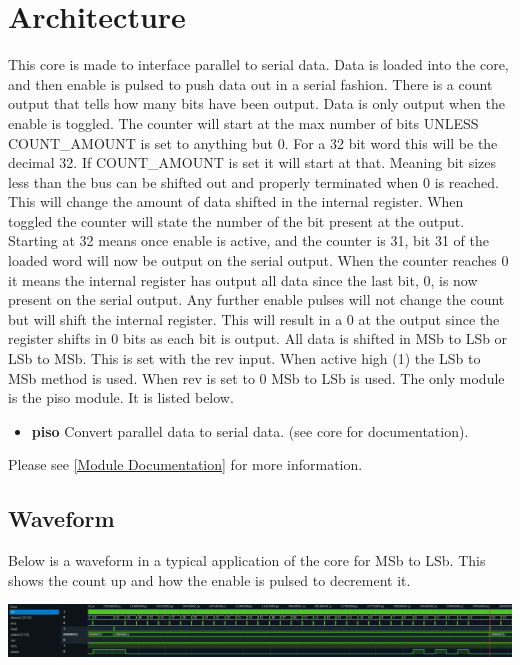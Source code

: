 \section{Architecture}
\par
This core is made to interface parallel to serial data. Data is loaded into the core, and then enable is pulsed to
push data out in a serial fashion. There is a count output that tells how many bits have been output. Data is only output
when the enable is toggled. The counter will start at the max number of bits UNLESS COUNT\_AMOUNT is set to anything but 0.
For a 32 bit word this will be the decimal 32. If COUNT\_AMOUNT is set it will start at that. Meaning bit sizes less than the bus
can be shifted out and properly terminated when 0 is reached. This will change the amount of data shifted in the internal register.
When toggled the counter will state the number of the bit present at the output. Starting at 32 means once enable is active,
and the counter is 31, bit 31 of the loaded word will now be output on the serial output. When the counter reaches 0 it means
the internal register has output all data since the last bit, 0, is now present on the serial output. Any further enable
pulses will not change the count but will shift the internal register. This will result in a 0 at the output since the register
shifts in 0 bits as each bit is output. All data is shifted in MSb to LSb or LSb to MSb. This is set with the rev input.
When active high (1) the LSb to MSb method is used. When rev is set to 0 MSb to LSb is used.
The only module is the piso module. It is listed below.

\begin{itemize}
  \item \textbf{piso} Convert parallel data to serial data. (see core for documentation).
\end{itemize}

Please see \ref{Module Documentation} for more information.

\subsection{Waveform}
\par
Below is a waveform in a typical application of the core for MSb to LSb. This shows the count up and how the enable is pulsed to decrement it.

\includegraphics[width=\textwidth]{img/diagrams/waveform_rev0.png}

